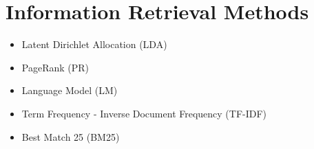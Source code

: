 
\section{Information Retrieval Methods}


\begin{frame}{\insertsection}
    \begin{itemize}
        \item Latent Dirichlet Allocation (LDA)
        \item PageRank (PR)
        \item Language Model (LM)
        \item Term Frequency - Inverse Document Frequency (TF-IDF)
        \item Best Match 25 (BM25)
    \end{itemize}
\end{frame}

